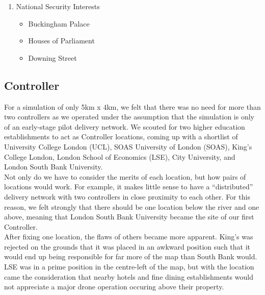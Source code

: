 \documentclass[a4paper,11pt,titlepage]{report}
\begin{document}
\begin{enumerate}
\begin{multicols}{2}
\begin{itemize}
       \item The Shard
       \item London Eye
     \end{itemize}
   \end{multicols}
   \item National Security Interests
   \begin{multicols}{2}
     \begin{itemize}
       \item Buckingham Palace
       \item Houses of Parliament
       \item Downing Street
     \end{itemize}
   \end{multicols}
\end{enumerate}

\clearpage
\subsection{Controller}
For a simulation of only 5km x 4km, we felt that there was no need for more than two controllers as we operated under the assumption that the simulation is only of an early-stage pilot delivery network. We scouted for two higher education establishments to act as Controller locations, coming up with a shortlist of University College London (UCL), SOAS University of London (SOAS), King's College London, London School of Economics (LSE), City University, and London South Bank University.\\

Not only do we have to consider the merits of each location, but how pairs of locations would work. For example, it makes little sense to have a ``distributed'' delivery network with two controllers in close proximity to each other. For this reason, we felt strongly that there should be one location below the river and one above, meaning that London South Bank University became the site of our first Controller.\\

After fixing one location, the flaws of others became more apparent. King's was rejected on the grounds that it was placed in an awkward position such that it would end up being responsible for far more of the map than South Bank would. LSE was in a prime position in the centre-left of the map, but with the location came the consideration that nearby hotels and fine dining establishments would not appreciate a major drone operation occuring above their property.\\
\end{document}
